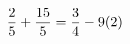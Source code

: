 \documentclass[preview]{standalone}
\begin{document}
\begin{align*}
\special{dvisvgm:raw <g id='unique000'>}\frac{2}{5} + \frac{15}{5} = \frac{3}{4} - 9(2)\special{dvisvgm:raw </g>}
\end{align*}
\end{document}
